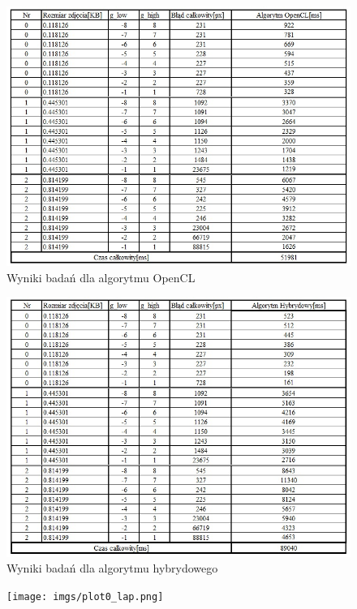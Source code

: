 \documentclass[document.tex]{subfiles}
\begin{document}
\begin{figure}[h]
\includegraphics[scale=0.75]{imgs/results_lap_gpu.jpg}
\caption{Wyniki badań dla algorytmu OpenCL}
\label{fig:results_lap_gpu}
\end{figure}

\begin{figure}[h]
\includegraphics[scale=0.75]{imgs/results_lap_hybrid.jpg}
\caption{Wyniki badań dla algorytmu hybrydowego}
\label{fig:results_lap_hybrid}
\end{figure}


\begin{figure}[h]
\texttt{[image: imgs/plot0\_lap.png]}
\caption*{}
\label{fig:results_lap_hybrid}
\end{figure}
\end{document}
